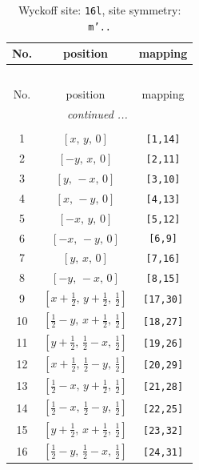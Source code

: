 \documentclass[fleqn,8pt]{jsarticle}
\begin{document}
\renewcommand{\arraystretch}{1.2}
\begin{longtable}{ccc}
\caption{Wyckoff site: {\tt 16l}, site symmetry: {\tt m'..}}
 \\
 \hline \hline
No. & position & mapping \\ \hline \endfirsthead

\multicolumn{2}{l}{\tablename\ \thetable{}} \\
 \hline \hline
No. & position & mapping \\ \hline \endhead

 \hline \hline
\multicolumn{2}{r}{\footnotesize\it continued ...} \\ \endfoot

 \hline \hline
\multicolumn{2}{r}{} \\ \endlastfoot

1 & $\left[ x,\, y,\, 0 \right]$ & {\tt [1,14]} \\ \hline
2 & $\left[ - y,\, x,\, 0 \right]$ & {\tt [2,11]} \\ \hline
3 & $\left[ y,\, - x,\, 0 \right]$ & {\tt [3,10]} \\ \hline
4 & $\left[ x,\, - y,\, 0 \right]$ & {\tt [4,13]} \\ \hline
5 & $\left[ - x,\, y,\, 0 \right]$ & {\tt [5,12]} \\ \hline
6 & $\left[ - x,\, - y,\, 0 \right]$ & {\tt [6,9]} \\ \hline
7 & $\left[ y,\, x,\, 0 \right]$ & {\tt [7,16]} \\ \hline
8 & $\left[ - y,\, - x,\, 0 \right]$ & {\tt [8,15]} \\ \hline
9 & $\left[ x + \frac{1}{2},\, y + \frac{1}{2},\, \frac{1}{2} \right]$ & {\tt [17,30]} \\ \hline
10 & $\left[ \frac{1}{2} - y,\, x + \frac{1}{2},\, \frac{1}{2} \right]$ & {\tt [18,27]} \\ \hline
11 & $\left[ y + \frac{1}{2},\, \frac{1}{2} - x,\, \frac{1}{2} \right]$ & {\tt [19,26]} \\ \hline
12 & $\left[ x + \frac{1}{2},\, \frac{1}{2} - y,\, \frac{1}{2} \right]$ & {\tt [20,29]} \\ \hline
13 & $\left[ \frac{1}{2} - x,\, y + \frac{1}{2},\, \frac{1}{2} \right]$ & {\tt [21,28]} \\ \hline
14 & $\left[ \frac{1}{2} - x,\, \frac{1}{2} - y,\, \frac{1}{2} \right]$ & {\tt [22,25]} \\ \hline
15 & $\left[ y + \frac{1}{2},\, x + \frac{1}{2},\, \frac{1}{2} \right]$ & {\tt [23,32]} \\ \hline
16 & $\left[ \frac{1}{2} - y,\, \frac{1}{2} - x,\, \frac{1}{2} \right]$ & {\tt [24,31]} \\
\end{longtable}
\end{document}
